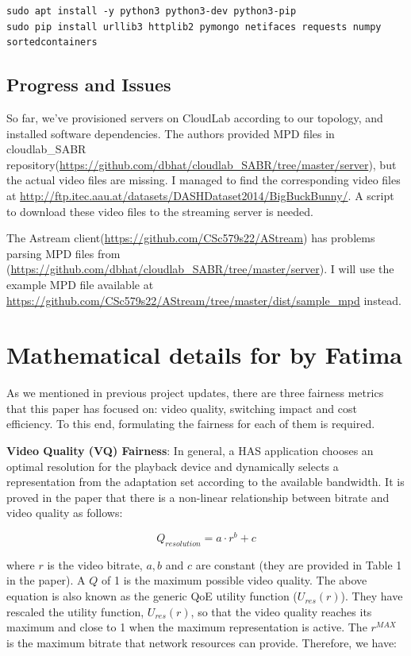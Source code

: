 \documentclass{article}
\begin{document}
\begin{verbatim}
sudo apt install -y python3 python3-dev python3-pip
sudo pip install urllib3 httplib2 pymongo netifaces requests numpy sortedcontainers
\end{verbatim}

\subsection{Progress and Issues}
So far, we've provisioned servers on CloudLab according to our topology, and installed software dependencies. The authors provided MPD files in cloudlab\_SABR repository(\url{https://github.com/dbhat/cloudlab_SABR/tree/master/server}), but the actual video files are missing. I managed to find the corresponding video files at \url{http://ftp.itec.aau.at/datasets/DASHDataset2014/BigBuckBunny/}. A script to download these video files to the streaming server is needed. 

The Astream client(\url{https://github.com/CSc579s22/AStream}) has problems parsing MPD files from (\url{https://github.com/dbhat/cloudlab_SABR/tree/master/server}). I will use the example MPD file available at \url{https://github.com/CSc579s22/AStream/tree/master/dist/sample_mpd} instead. 

\section{Mathematical details for \texorpdfstring{\cite{mu_scalable_2016}}, by Fatima}

As we mentioned in previous project updates, there are three fairness metrics that this paper has focused on: video quality, switching impact and cost efficiency. To this end, formulating the fairness for each of them is required. 

\textbf{Video Quality (VQ) Fairness}: In general, a HAS application chooses an optimal resolution for the playback device and dynamically selects a representation from the adaptation set according to the available bandwidth. It is proved in the paper that there is a non-linear relationship between bitrate and video quality as follows: 

\begin{equation}
Q_{resolution}=a \cdot r^b+c
\end{equation}

where $r$ is the video bitrate, $a,b$ and $c$ are constant (they are provided in Table 1 in the paper). A $Q$ of 1 is the maximum possible video quality. The above equation is also known as the generic QoE utility function ($U_{res}(r)$). They have rescaled the utility function, $U_{res}(r)$, so that the video quality reaches its maximum and close to 1 when the maximum representation is active. The $r^{MAX}$ is the maximum bitrate that network resources can provide. Therefore, we have:
\end{document}
